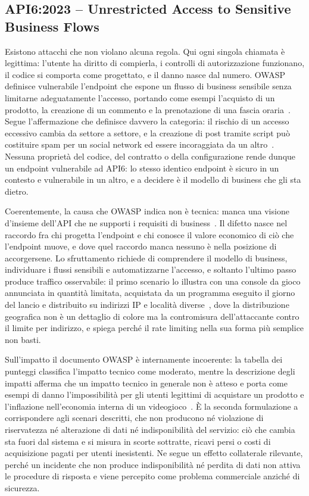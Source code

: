 \subsection{API6:2023 -- Unrestricted Access to Sensitive Business Flows}
\label{subsubsec:api6}

Esistono attacchi che non violano alcuna regola. Qui ogni singola chiamata è
legittima: l'utente ha diritto di compierla, i controlli di
autorizzazione funzionano, il codice si comporta come progettato, e il danno
nasce dal numero. OWASP definisce vulnerabile l'endpoint che espone un flusso
di business sensibile senza limitarne adeguatamente l'accesso, portando come
esempi l'acquisto di un prodotto, la creazione di un commento e la prenotazione
di una fascia oraria~\cite{owasp2023api6}. Segue l'affermazione che definisce
davvero la categoria: il rischio di un accesso eccessivo cambia da settore a
settore, e la creazione di post tramite script può costituire spam per un
social network ed essere incoraggiata da un altro~\cite{owasp2023api6}. Nessuna
proprietà del codice, del contratto o della configurazione rende dunque un
endpoint vulnerabile ad API6: lo stesso identico endpoint è sicuro in un
contesto e vulnerabile in un altro, e a decidere è il modello di business che
gli sta dietro.

Coerentemente, la causa che OWASP indica non è tecnica: manca una visione
d'insieme dell'API che ne supporti i requisiti di
business~\cite{owasp2023api6}. Il difetto nasce nel raccordo fra chi progetta
l'endpoint e chi conosce il valore economico di ciò che l'endpoint muove, e
dove quel raccordo manca nessuno è nella posizione di accorgersene. Lo
sfruttamento richiede di comprendere il modello di business, individuare i
flussi sensibili e automatizzarne l'accesso, e soltanto l'ultimo passo produce
traffico osservabile: il primo scenario lo illustra con una console da gioco
annunciata in quantità limitata, acquistata da un programma eseguito il giorno
del lancio e distribuito su indirizzi IP e località
diverse~\cite{owasp2023api6}, dove la distribuzione geografica non è un
dettaglio di colore ma la contromisura dell'attaccante contro il limite per
indirizzo, e spiega perché il rate limiting nella sua forma più semplice non
basti.

Sull'impatto il documento OWASP è internamente incoerente: la tabella dei
punteggi classifica l'impatto tecnico come moderato, mentre la descrizione
degli impatti afferma che un impatto tecnico in generale non è atteso e porta
come esempi di danno l'impossibilità per gli utenti legittimi di acquistare un
prodotto e l'inflazione nell'economia interna di un
videogioco~\cite{owasp2023api6}. È la seconda formulazione a corrispondere agli
scenari descritti, che non producono né violazione di riservatezza né
alterazione di dati né indisponibilità del servizio: ciò che cambia sta fuori
dal sistema e si misura in scorte sottratte, ricavi persi o costi di
acquisizione pagati per utenti inesistenti. Ne segue un effetto collaterale
rilevante, perché un incidente che non produce indisponibilità né perdita di
dati non attiva le procedure di risposta e viene percepito come problema
commerciale anziché di sicurezza.

